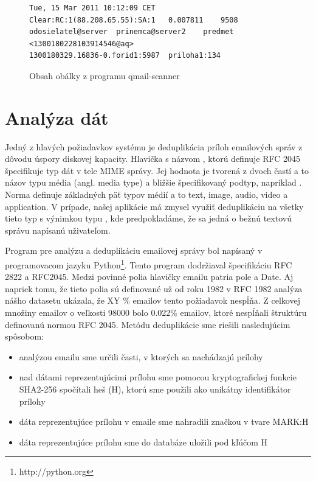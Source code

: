 \documentclass[11pt,twoside,a4paper]{book}
\begin{document}
\begin{figure}[h]
\begin{verbatim}
Tue, 15 Mar 2011 10:12:09 CET	Clear:RC:1(88.208.65.55):SA:1	0.007811	9508	odosielatel@server	prinemca@server2	predmet	<1300180228103914546@aq>	
1300180329.16836-0.forid1:5987	priloha1:134
\end{verbatim}
 \caption{Obsah obálky z programu qmail-scanner}
 \label{fig:envelope}
\end{figure}


\section{Analýza dát}
Jedný z hlavých požiadavkov systému je deduplikácia príloh emailových správ z dôvodu úspory diskovej kapacity. Hlavička s názvom , ktorú definuje RFC 2045 špecifikuje typ dát v tele MIME správy. Jej hodnota je tvorená z dvoch častí a to názov typu média (angl. media type) a bližšie špecifikovaný podtyp, napríklad . Norma definuje základných päť typov médií a to text, image, audio, video a application. V prípade, našej aplikácie má zmysel využiť deduplikáciu na všetky tieto typ s výnimkou typu , kde predpokladáme, že sa jedná o bežnú textovú správu napísanú uživateľom.

Program pre analýzu a deduplikáciu emailovej správy bol napísaný v programovacom jazyku Python\footnote{http://python.org}. Tento program dodržiaval špecifikáciu RFC 2822 a RFC2045. 
Medzi povinné polia hlavičky emailu patria pole  a {Date}. Aj napriek tomu, že tieto polia sú definované už od roku 1982 v RFC 1982 analýza nášho datasetu ukázala, že XY \% emailov tento požiadavok nespĺňa. Z celkovej množiny emailov o veľkosti 98000 bolo 0.022\% emailov, ktoré nespĺňali štruktúru definovanú normou RFC 2045. Metódu deduplikácie sme riešili nasledujúcim spôsobom:

\begin{itemize}
 \item analýzou emailu sme určili časti, v ktorých sa nachádzajú prílohy
 \item nad dátami reprezentujúcimi prílohu sme pomocou kryptografickej funkcie SHA2-256 spočítali heš (H), ktorú sme použili ako unikátny identifikátor prílohy
 \item dáta reprezentujúce prílohu v emaile sme nahradili značkou v tvare MARK:H
 \item dáta reprezentujúce prílohu sme do databáze uložili pod kľúčom H
\end{itemize}
\end{document}
